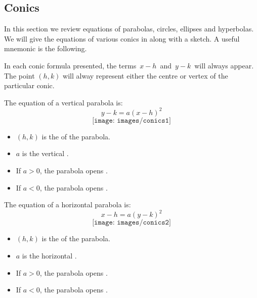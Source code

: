 \subsection{Conics}\label{sec:Conics}

In this section we review equations of parabolas, circles, ellipses and hyperbolas.
We will give the equations of various conics in  along with a sketch.
A useful mnemonic is the following.\\

\begin{formulabox}[Mnemonic]
In each conic formula presented, the terms $\,x-h\,$ and $\,y-k\,$ will always appear. 
The point $(h,k)$ will alway represent either the centre or vertex of the particular conic.
\end{formulabox}


\bigskip\noindent
{} The equation of a vertical parabola is:
$$y-k=a(x-h)^2$$
$$\texttt{[image: images/conics1]}$$
\begin{multicols}{2}
\begin{itemize}
	\item $(h,k)$ is the  of the parabola.
	\item $a$ is the vertical . 
	\item If $a>0$, the parabola opens .
	\item If $a<0$, the parabola opens .
\end{itemize}
\end{multicols}

\bigskip\noindent
{} The equation of a horizontal parabola is:
$$x-h=a(y-k)^2$$
$$\texttt{[image: images/conics2]}$$
\begin{multicols}{2}
\begin{itemize}
	\item $(h,k)$ is the  of the parabola.
	\item $a$ is the horizontal . 
	\item If $a>0$, the parabola opens .
	\item If $a<0$, the parabola opens .
\end{itemize}
\end{multicols} 

